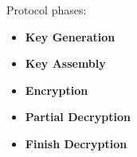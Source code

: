 \begin{frame}
\begin{block}{Protocol phases: }
\begin{itemize}
 \item<1-> \alert<1,1>{ \textbf{Key Generation} }
 \item<2-> \alert<2,2>{ \textbf{Key Assembly} }
 \item<3-> \alert<3,3>{ \textbf{Encryption} }
 \item<4-> \alert<4,4>{ \textbf{Partial Decryption} } 
 \item<5-> \alert<5,5>{ \textbf{Finish Decryption} }
 \end{itemize} 
\end{block}
\begin{overprint}
  \begin{center}\end{center}
  \begin{center}\end{center}
  \begin{center}\end{center}
  \begin{center}\end{center}
  \begin{center}\end{center}
\end{overprint}

\end{frame}

